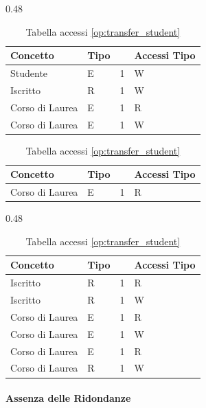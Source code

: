 \documentclass[a4paper,11pt]{article}
\begin{document}
\begin{table}[H]
    \centering
    \begin{subtable}{0.48\textwidth}
        \centering
        \begin{tabular}{l l l l}
            \toprule
            \textbf{Concetto} & \textbf{Tipo} & & \textbf{Accessi} \textbf{Tipo} \\
            \midrule
            Studente & E & 1 & W \\
            Iscritto & R & 1 & W \\
            Corso di Laurea & E & 1 & R \\
            Corso di Laurea & E & 1 & W \\
            \bottomrule
        \end{tabular}
        \caption{Tabella accessi \ref{op:insert_student}}
        \vspace{1cm}
        \begin{tabular}{l l l l }
            \toprule
            \textbf{Concetto} & \textbf{Tipo} & & \textbf{Accessi} \textbf{Tipo} \\
            \midrule
            Corso di Laurea & E & 1 & R \\
            \bottomrule
        \end{tabular}
        \caption{Tabella accessi \ref{op:get_info_degree}}
    \end{subtable}
    \hfill
    \begin{subtable}{0.48\textwidth}
        \centering
        \begin{tabular}{l l l l}
            \toprule
            \textbf{Concetto} & \textbf{Tipo} & & \textbf{Accessi} \textbf{Tipo} \\
            \midrule
            Iscritto & R & 1 & R \\
            Iscritto & R & 1 & W \\
            Corso di Laurea & E & 1 & R \\
            Corso di Laurea & E & 1 & W \\
            Corso di Laurea & E & 1 & R \\
            Corso di Laurea & R & 1 & W \\
            \bottomrule
        \end{tabular}
        \caption{Tabella accessi \ref{op:transfer_student}}
    \end{subtable}
\end{table}


\paragraph{Assenza delle Ridondanze}
\end{document}
